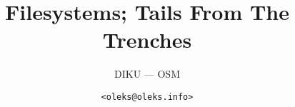 \documentclass[xcolor=table]{beamer}
\title{Filesystems; Tails From The Trenches}
\subtitle{DIKU --- OSM}
\author{\texttt{<oleks@oleks.info>}}
\begin{document}
\begin{frame} \titlepage \end{frame}














\end{document}
